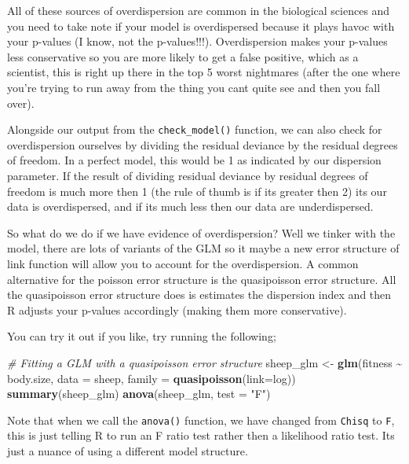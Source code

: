 \documentclass[
]{book}
\newenvironment{Shaded}{\begin{snugshade}}{\end{snugshade}}
\newcommand{\AttributeTok}[1]{\textcolor[rgb]{0.13,0.29,0.53}{#1}}
\newcommand{\CommentTok}[1]{\textcolor[rgb]{0.56,0.35,0.01}{\textit{#1}}}
\newcommand{\FunctionTok}[1]{\textcolor[rgb]{0.13,0.29,0.53}{\textbf{#1}}}
\newcommand{\NormalTok}[1]{#1}
\newcommand{\OtherTok}[1]{\textcolor[rgb]{0.56,0.35,0.01}{#1}}
\newcommand{\SpecialCharTok}[1]{\textcolor[rgb]{0.81,0.36,0.00}{\textbf{#1}}}
\newcommand{\StringTok}[1]{\textcolor[rgb]{0.31,0.60,0.02}{#1}}
\begin{document}
All of these sources of overdispersion are common in the biological sciences and you need to take note if your model is overdispersed because it plays havoc with your p-values (I know, not the p-values!!!). Overdispersion makes your p-values less conservative so you are more likely to get a false positive, which as a scientist, this is right up there in the top 5 worst nightmares (after the one where you're trying to run away from the thing you cant quite see and then you fall over).

Alongside our output from the \texttt{check\_model()} function, we can also check for overdispersion ourselves by dividing the residual deviance by the residual degrees of freedom. In a perfect model, this would be 1 as indicated by our dispersion parameter. If the result of dividing residual deviance by residual degrees of freedom is much more then 1 (the rule of thumb is if its greater then 2) its our data is overdispersed, and if its much less then our data are underdispersed.

So what do we do if we have evidence of overdispersion? Well we tinker with the model, there are lots of variants of the GLM so it maybe a new error structure of link function will allow you to account for the overdispersion. A common alternative for the poisson error structure is the quasipoisson error structure. All the quasipoisson error structure does is estimates the dispersion index and then R adjusts your p-values accordingly (making them more conservative).

You can try it out if you like, try running the following;

\begin{Shaded}
\begin{Highlighting}[]
\CommentTok{\# Fitting a GLM with a quasipoisson error structure}
\NormalTok{sheep\_glm }\OtherTok{\textless{}{-}} \FunctionTok{glm}\NormalTok{(fitness }\SpecialCharTok{\textasciitilde{}}\NormalTok{ body.size, }\AttributeTok{data =}\NormalTok{ sheep, }\AttributeTok{family =} \FunctionTok{quasipoisson}\NormalTok{(}\AttributeTok{link=}\NormalTok{log))}
\FunctionTok{summary}\NormalTok{(sheep\_glm)}
\FunctionTok{anova}\NormalTok{(sheep\_glm, }\AttributeTok{test =} \StringTok{"F"}\NormalTok{)}
\end{Highlighting}
\end{Shaded}

Note that when we call the \texttt{anova()} function, we have changed from \texttt{Chisq} to \texttt{F}, this is just telling R to run an F ratio test rather then a likelihood ratio test. Its just a nuance of using a different model structure.
\end{document}
